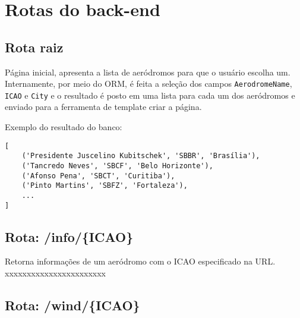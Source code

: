 \chapter{Rotas do back-end}

\section{Rota raiz}

Página inicial, apresenta a lista de aeródromos para que o usuário escolha um. 
Internamente, por meio do ORM, é feita a seleção dos campos \texttt{AerodromeName},
\texttt{ICAO} e \texttt{City} e o resultado é posto em uma lista para cada um dos aeródromos e enviado
para a ferramenta de template criar a página.

Exemplo do resultado do banco:
\begin{verbatim}
[
    ('Presidente Juscelino Kubitschek', 'SBBR', 'Brasília'), 
    ('Tancredo Neves', 'SBCF', 'Belo Horizonte'), 
    ('Afonso Pena', 'SBCT', 'Curitiba'), 
    ('Pinto Martins', 'SBFZ', 'Fortaleza'), 
    ...
]
\end{verbatim}

\section{Rota: /info/\{ICAO\}}

Retorna informações de um aeródromo com o ICAO especificado na URL.
xxxxxxxxxxxxxxxxxxxxxxx

\section{Rota: /wind/\{ICAO\}}

